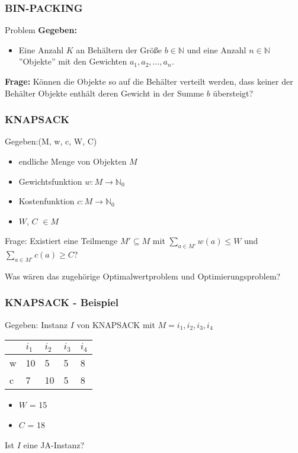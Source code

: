 \documentclass{beamer}
\begin{document}
\begin{frame}
\frametitle{BIN-PACKING}
\begin{block}{Problem}
\textbf{Gegeben:}
\begin{itemize}
 \item Eine Anzahl $K$ an Behältern der Größe $b \in \mathbb{N}$ und eine Anzahl $n \in \mathbb{N}$ ''Objekte'' mit den Gewichten $a_1, a_2,\ldots,a_n$.
\end{itemize}
\textbf{Frage:}
Können die Objekte so auf die Behälter verteilt werden, dass keiner der Behälter Objekte enthält deren Gewicht in der Summe $b$ übersteigt?
\end{block}
\end{frame}

\begin{frame}
 \frametitle{KNAPSACK}
 Gegeben:(M, w, c, W, C)
 \begin{itemize}
  \item endliche Menge von Objekten $M$
  \item Gewichtsfunktion $w:M \rightarrow \mathbb{N}_0$
  \item Kostenfunktion $c:M \rightarrow \mathbb{N}_0$
  \item $W$, $C$ $\in M$
 \end{itemize}
Frage: Existiert eine Teilmenge $M' \subseteq M$ mit $\sum_{a\in M'} w(a) \leq W$ und $\sum_{a\in  M'} c(a) \geq C$?
\pause

Was wären das zugehörige Optimalwertproblem und Optimierungsproblem?
\end{frame}

\begin{frame}
 \frametitle{KNAPSACK - Beispiel}
 Gegeben: Instanz $I$ von KNAPSACK mit $M = {i_1, i_2, i_3, i_4}$
  \begin{center}
\begin{tabular}{l|l|l|l|l}
	  &$i_1$ &$i_2$ &$i_3$ 	&$i_4$\\
  \hline
	w &10	 &5	&5	&8\\
  \hline
	c &7	 &10	&5	&8\\	
\end{tabular}
\end{center}
\begin{itemize}
 \item $W$ = 15
 \item $C$ = 18
\end{itemize}
Ist $I$ eine JA-Instanz?
\end{frame}
\end{document}
